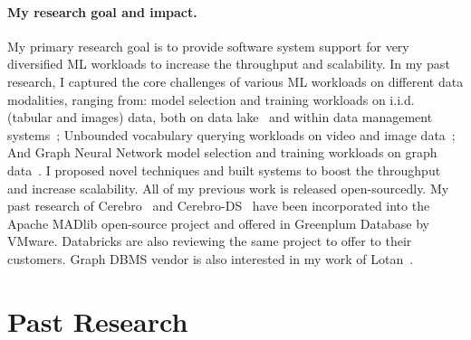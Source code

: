 \documentclass[letterpaper]{article}
\begin{document}
\paragraph{My research goal and impact.} My primary research goal is to provide software system support for very diversified ML workloads to increase the throughput and scalability. In my past research, I captured the core challenges of various ML workloads on different data modalities, ranging from: model selection and training workloads on i.i.d. (tabular and images) data, both on data lake~\cite{cerebro} and within data management systems~\cite{cerebro-ds}; Unbounded vocabulary querying workloads on video and image data~\cite{panorama}; And Graph Neural Network model selection and training workloads on graph data~\cite{lotan}. I proposed novel techniques and built systems to boost the throughput and increase scalability. All of my previous work is released open-sourcedly. My past research of Cerebro~\cite{cerebro} and Cerebro-DS~\cite{cerebro-ds} have been incorporated into the Apache MADlib open-source project and offered in Greenplum Database by VMware. Databricks are also reviewing the same project to offer to their customers. Graph DBMS vendor is also interested in my work of Lotan~\cite{lotan}.



%
%
%
%
%
%
%
%
%
%
%
%
\section*{Past Research}
\end{document}
